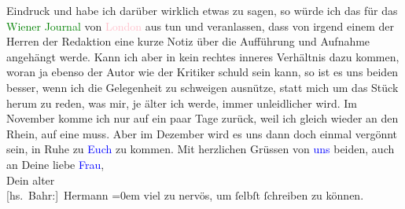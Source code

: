                Eindruck und habe ich darüber wirklich etwas zu sagen, so würde ich das für das \textcolor{green}{Wiener Journal}{}\ledrightnote{\textcolor{green}{Neues Wiener Journal}} von \textcolor{pink}{London}{}\ledrightnote{\textcolor{pink}{London}} aus tun und veranlassen, dass von irgend einem der Herren {\pb}der Redaktion eine kurze Notiz über die Aufführung
               und Aufnahme angehängt werde. Kann ich aber in kein rechtes inneres Verhältnis dazu
               kommen, woran ja ebenso der Autor wie der Kritiker schuld sein kann, so ist es uns
               beiden besser, wenn ich die Gelegenheit zu schweigen ausnütze, statt mich um das
               Stück herum zu reden, was mir, je älter ich werde, immer unleidlicher wird.\pend
           \pstart
           Im November komme ich nur auf ein paar Tage zurück, weil ich gleich
               wieder an den Rhein, auf eine \label{K_L01958_3v}\label{K_L01958_3h} muss. Aber im
                  Dezember wird es uns dann doch einmal vergönnt sein, in Ruhe zu \textcolor{blue}{Euch}{} zu kommen.\pend
           \pstart
           {\pb}Mit herzlichen Grüssen von \textcolor{blue}{uns}{} beiden, auch an Deine liebe \textcolor{blue}{Frau}{},{\\[\baselineskip]}Dein alter{\\[\baselineskip]}\spacefill\mbox{{[}hs. Bahr:{]} Hermann}\pend
           \leftskip=0em{}\pstart
           \noindent{}viel zu nervös, um ſelbſt ſchreiben zu können.\pend
           \endnumbering{}  
      